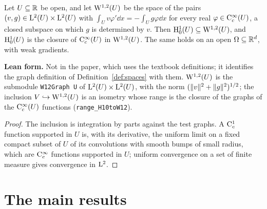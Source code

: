 \begin{proposition}
  \label{prop:sobolev}
  \leanok
  Let $U\subseteq\mathbb{R}$ be open, and let $\mathrm{W}^{1,2}(U)$ be the space of the pairs
  $(v,g)\in\mathrm{L}^2(U)\times\mathrm{L}^2(U)$ with $\int_Uv\varphi'\dd x=-\int_Ug\varphi\dd x$ for every
  real $\varphi\in\mathrm{C}_c^\infty(U)$, a closed subspace on which $g$ is determined by $v$.  Then
  $\mathrm{H}_0^1(U)\subseteq\mathrm{W}^{1,2}(U)$, and $\mathrm{H}_0^1(U)$ is the closure of $\mathrm{C}_c^\infty(U)$ in
  $\mathrm{W}^{1,2}(U)$.  The same holds on an open $\Omega\subseteq\mathbb{R}^d$, with weak gradients.
\end{proposition}

\textbf{Lean form.}  Not in the paper, which uses the textbook definitions; it identifies the
graph definition of Definition~\ref{def:spaces} with them.  $\mathrm{W}^{1,2}(U)$ is the submodule
\texttt{W12Graph U} of $\mathrm{L}^2(U)\times\mathrm{L}^2(U)$, with the norm $(\lVert v\rVert^2+\lVert g\rVert^2)^{1/2}$;
the inclusion $V\hookrightarrow\mathrm{W}^{1,2}(U)$ is an isometry whose range is the closure of the
graphs of the $\mathrm{C}_c^\infty(U)$ functions (\texttt{range\_H10toW12}).

\begin{proof}
  \leanok
  The inclusion is integration by parts against the test graphs.  A $\mathrm{C}_c^1$ function supported in
  $U$ is, with its derivative, the uniform limit on a fixed compact subset of $U$ of its
  convolutions with smooth bumps of small radius, which are $\mathrm{C}_c^\infty$ functions supported in
  $U$; uniform convergence on a set of finite measure gives convergence in $\mathrm{L}^2$.
\end{proof}

\section{The main results}

